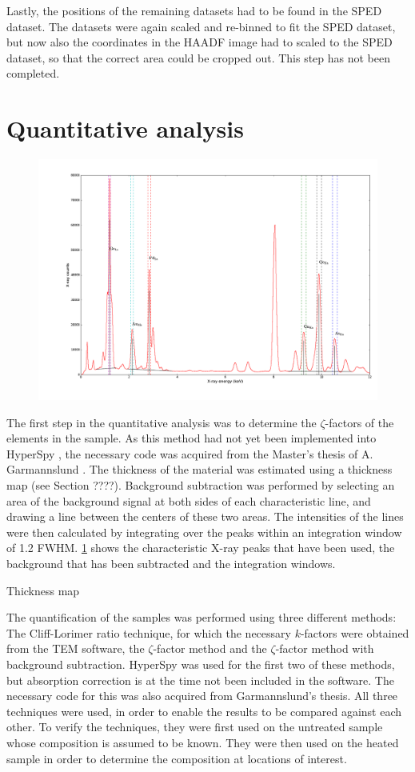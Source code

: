 Lastly, the positions of the remaining datasets had to be found in the SPED dataset. The datasets were again scaled and re-binned to fit the SPED dataset, but now also the coordinates in the HAADF image had to scaled to the SPED dataset, so that the correct area could be cropped out. This step has not been completed.

\section{Quantitative analysis}

\begin{figure}
	\centering
	\includegraphics[width=0.7\linewidth]{fig/other/UnheatedA-full-spectrum2}
	\caption{}
	\label{fig:spectrum-with-info}
\end{figure}
The first step in the quantitative analysis was to determine the $\zeta$-factors of the elements in the sample. As this method had not yet been implemented into HyperSpy \cite{hyperspy}, the necessary code was acquired from the Master's thesis of A. Garmannslund \cite{andreas}. The thickness of the material was estimated using a thickness map (see Section ????). Background subtraction was performed by selecting an area of the background signal at both sides of each characteristic line, and drawing a line between the centers of these two areas. The intensities of the lines were then calculated by integrating over the peaks within an integration window of 1.2 FWHM. \cref{fig:spectrum-with-info} shows the characteristic X-ray peaks that have been used, the background that has been subtracted and the integration windows.

Thickness map

The quantification of the samples was performed using three different methods: The Cliff-Lorimer ratio technique, for which the necessary $k$-factors were obtained from the TEM software, the $\zeta$-factor method and the $\zeta$-factor method with background subtraction. HyperSpy was used for the first two of these methods, but absorption correction is at the time not been included in the software. The necessary code for this was also acquired from Garmannslund's thesis. All three techniques were used, in order to enable the results to be compared against each other. To verify the techniques, they were first used on the untreated sample whose composition is assumed to be known. They were then used on the heated sample in order to determine the composition at locations of interest.